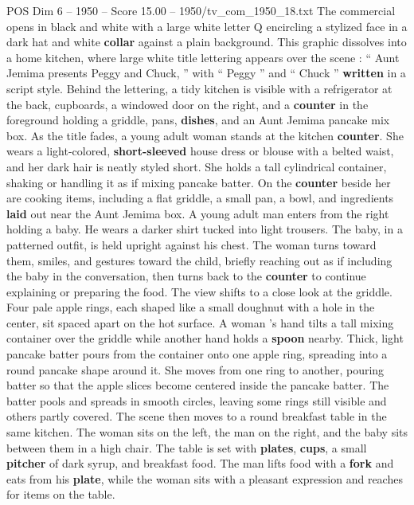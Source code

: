 \begin{textsample}{POS Dim 6 – 1950 – Score 15.00 – 1950/tv\_com\_1950\_18.txt}  \label{ex:f6_pos_005}
The commercial opens in black and white with a large white letter Q encircling a stylized face in a dark hat and white \textbf{collar} against a plain background.
This graphic dissolves into a home kitchen, where large white title lettering appears over the scene : “ Aunt Jemima presents Peggy and Chuck, ” with “ Peggy ” and “ Chuck ” \textbf{written} in a script style.
Behind the lettering, a tidy kitchen is visible with a refrigerator at the back, cupboards, a windowed door on the right, and a \textbf{counter} in the foreground holding a griddle, pans, \textbf{dishes}, and an Aunt Jemima pancake mix box.
As the title fades, a young adult woman stands at the kitchen \textbf{counter}.
She wears a light-colored, \textbf{short-sleeved} house dress or blouse with a belted waist, and her dark hair is neatly styled short.
She holds a tall cylindrical container, shaking or handling it as if mixing pancake batter.
On the \textbf{counter} beside her are cooking items, including a flat griddle, a small pan, a bowl, and ingredients \textbf{laid} out near the Aunt Jemima box.
A young adult man enters from the right holding a baby.
He wears a darker shirt tucked into light trousers.
The baby, in a patterned outfit, is held upright against his chest.
The woman turns toward them, smiles, and gestures toward the child, briefly reaching out as if including the baby in the conversation, then turns back to the \textbf{counter} to continue explaining or preparing the food.
The view shifts to a close look at the griddle.
Four pale apple rings, each shaped like a small doughnut with a hole in the center, sit spaced apart on the hot surface.
A woman ’s hand tilts a tall mixing container over the griddle while another hand holds a \textbf{spoon} nearby.
Thick, light pancake batter pours from the container onto one apple ring, spreading into a round pancake shape around it.
She moves from one ring to another, pouring batter so that the apple slices become centered inside the pancake batter.
The batter pools and spreads in smooth circles, leaving some rings still visible and others partly covered.
The scene then moves to a round breakfast table in the same kitchen.
The woman sits on the left, the man on the right, and the baby sits between them in a high chair.
The table is set with \textbf{plates}, \textbf{cups}, a small \textbf{pitcher} of dark syrup, and breakfast food.
The man lifts food with a \textbf{fork} and eats from his \textbf{plate}, while the woman sits with a pleasant expression and reaches for items on the table.

\end{textsample}
